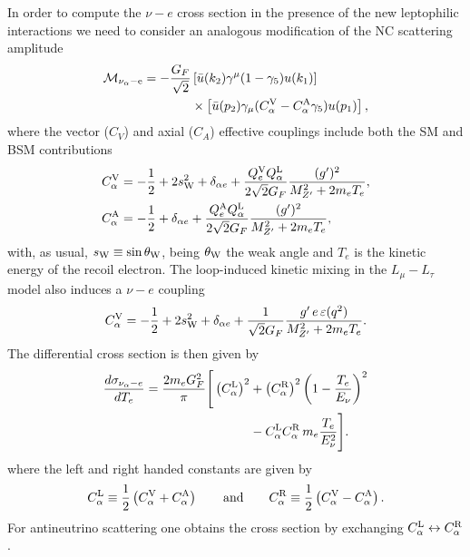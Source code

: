 In order to compute the $\nu-e$ cross section in the presence of the new leptophilic interactions we need to consider an analogous modification of the NC scattering amplitude
\begin{align}
    \mathcal{M}_{\rm \nu_\alpha-e} = - \frac{G_F}{\sqrt{2}}  & \left[\bar{u}(k_2)\gamma^\mu(1-\gamma_5)u(k_1)\right] \nonumber\\ & \times \left[\bar{u}(p_2)\gamma_\mu(C^{\rm V}_\alpha-C^{\rm A}_\alpha\gamma_5)u(p_1)\right],
\end{align}
where the vector ($C_V$) and axial ($C_A$) effective couplings include both the SM and BSM contributions
%
\begin{subequations}
\begin{align}
%
C^{\rm V}_\alpha &= -\frac{1}{2}+2s^2_{\rm W} + \delta_{\alpha e} + \frac{Q^{\rm V}_{e} Q^{\rm L}_{\alpha} }{2\sqrt{2}G_F} \frac{(g^\prime)^2}{M_{Z^\prime}^2+2m_eT_e},\\
%
C^{\rm A}_\alpha &= -\frac{1}{2} + \delta_{\alpha e} + \frac{Q^{\rm A}_{e} Q^{\rm L}_{\alpha} }{2\sqrt{2} G_F} \frac{(g^\prime)^2}{ M_{Z^\prime}^2 + 2m_e T_e},
\label{eq:c_prescription_nue}
%
\end{align}
\end{subequations}
with, as usual, $s_{\rm W}\equiv\sin\theta_{\rm W}$, being $\theta_{\rm W}$ the weak angle and $T_e$ is the kinetic energy of the recoil electron. The loop-induced kinetic mixing in the $L_\mu-L_\tau$ model also induces a $\nu - e$ coupling
%
\begin{equation}
C^{\rm V}_\alpha = -\frac{1}{2}+2s^2_{\rm W} + \delta_{\alpha e} + \frac{1 }{\sqrt{2}G_F} \frac{g^\prime \, e\, \varepsilon(q^2)}{M_{Z^\prime}^2+2m_eT_e}.
\end{equation}
%
The differential cross section is then given by 
%
\begin{align}\label{nuexsection}
  \frac{d\sigma_{\nu_{\alpha}-e}}{dT_e} = \frac{2m_eG_F^2}{\pi} \Bigg[ \left(C^{\rm L}_\alpha\right)^2 &+\left(C^{\rm R}_\alpha\right)^2\left(1-\frac{T_e}{E_\nu}\right)^2\nonumber\\&-C^{\rm L}_\alpha C^{\rm R}_\alpha \, m_e \frac{T_e}{E_\nu^2} \Bigg].
\end{align}
%
where the left and right handed constants are given by
%
\begin{align*}
%
C^{\rm L}_\alpha \equiv \frac{1}{2}\left(C^{\rm V}_\alpha + C^{\rm A}_\alpha\right) \qquad\text{and}\qquad
%
C^{\rm R}_\alpha \equiv \frac{1}{2}\left(C^{\rm V}_\alpha - C^{\rm A}_\alpha\right).
%
\end{align*}
%
For antineutrino scattering one obtains the cross section by exchanging $C_{\alpha}^{\rm L} \leftrightarrow C_{\alpha}^{\rm R}$. 

